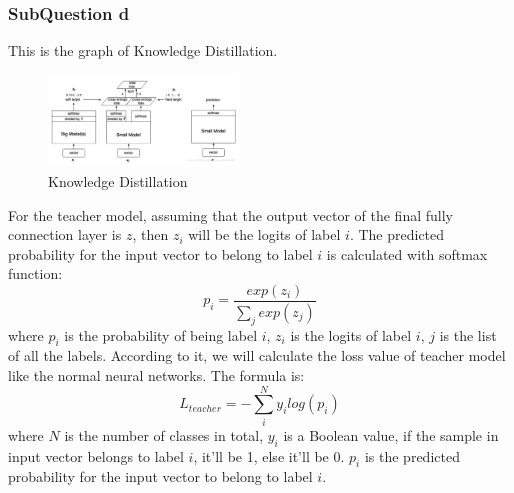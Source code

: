 \documentclass[conference]{IEEEtran}
\begin{document}
  \subsubsection{SubQuestion d}
  This is the graph of Knowledge Distillation.
  \begin{figure}[h] 
      \centering
      \includegraphics[width=0.45\textwidth]{./graphs/KD.png}
      \caption{Knowledge Distillation}
      \label{Fig.t1q3e}
  \end{figure}
  For the teacher model, assuming that the output vector of the final fully connection layer is $z$, then $z_{i}$ will be the logits of label $i$. 
  The predicted probability for the input vector to belong to label $i$ is calculated with softmax function:
  $$p_{i}=\frac{exp(z_{i})}{\sum_{j}exp(z_{j})}$$
  where $p_{i}$ is the probability of being label $i$, $z_{i}$ is the logits of label $i$, $j$ is the list of all the labels.
  According to it, we will calculate the loss value of teacher model like the normal neural networks. The formula is:
  $$L_{teacher}=-\sum_{i}^{N}y_{i}log(p_{i})$$
  where $N$ is the number of classes in total, $y_{i}$ is a Boolean value, if the sample in input vector belongs to label $i$, it'll be 1, else it'll be 0. $p_{i}$ is the predicted probability for the input vector to belong to label $i$.
  \par
  
\end{document}
